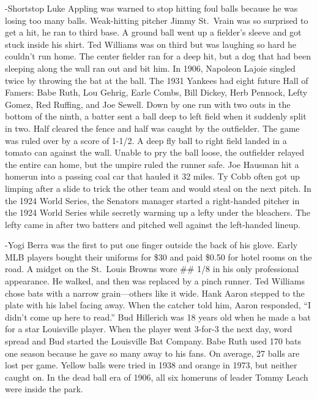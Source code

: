 \documentclass[
]{article}
\begin{document}
-Shortstop Luke Appling was warned to stop hitting foul balls because he
was losing too many balls. Weak-hitting pitcher Jimmy St.~Vrain was so
surprised to get a hit, he ran to third base. A ground ball went up a
fielder's sleeve and got stuck inside his shirt. Ted Williams was on
third but was laughing so hard he couldn't run home. The center fielder
ran for a deep hit, but a dog that had been sleeping along the wall ran
out and bit him. In 1906, Napoleon Lajoie singled twice by throwing the
bat at the ball. The 1931 Yankees had eight future Hall of Famers: Babe
Ruth, Lou Gehrig, Earle Combs, Bill Dickey, Herb Pennock, Lefty Gomez,
Red Ruffing, and Joe Sewell. Down by one run with two outs in the bottom
of the ninth, a batter sent a ball deep to left field when it suddenly
split in two. Half cleared the fence and half was caught by the
outfielder. The game was ruled over by a score of 1-1/2. A deep fly ball
to right field landed in a tomato can against the wall. Unable to pry
the ball loose, the outfielder relayed the entire can home, but the
umpire ruled the runner safe. Joe Hausman hit a homerun into a passing
coal car that hauled it 32 miles. Ty Cobb often got up limping after a
slide to trick the other team and would steal on the next pitch. In the
1924 World Series, the Senators manager started a right-handed pitcher
in the 1924 World Series while secretly warming up a lefty under the
bleachers. The lefty came in after two batters and pitched well against
the left-handed lineup.

-Yogi Berra was the first to put one finger outside the back of his
glove. Early MLB players bought their uniforms for \$30 and paid \$0.50
for hotel rooms on the road. A midget on the St.~Louis Browns wore \#\#
1/8 in his only professional appearance. He walked, and then was
replaced by a pinch runner. Ted Williams chose bats with a narrow
grain---others like it wide. Hank Aaron stepped to the plate with his
label facing away. When the catcher told him, Aaron responded, ``I
didn't come up here to read.'' Bud Hillerich was 18 years old when he
made a bat for a star Louisville player. When the player went 3-for-3
the next day, word spread and Bud started the Louisville Bat Company.
Babe Ruth used 170 bats one season because he gave so many away to his
fans. On average, 27 balls are lost per game. Yellow balls were tried in
1938 and orange in 1973, but neither caught on. In the dead ball era of
1906, all six homeruns of leader Tommy Leach were inside the park.
\end{document}
